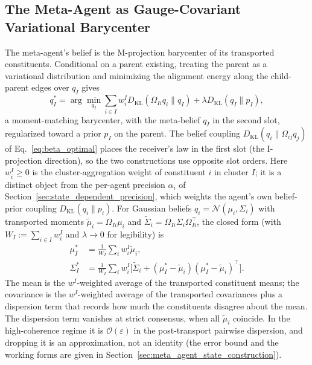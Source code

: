 \documentclass[11pt]{article}
\begin{document}
\subsection{The Meta-Agent as Gauge-Covariant Variational Barycenter}
\label{sec:meta_agent_definition}

The meta-agent's belief is the M-projection barycenter of its transported constituents. Conditional on a parent existing, treating the parent as a variational distribution and minimizing the alignment energy along the child-parent edges over $q_I$ gives
\begin{equation}
q_I^* = \arg\min_{q_I} \sum_{i \in I} w_i^I D_{\mathrm{KL}}(\Omega_{Ii} q_i \| q_I) + \lambda D_{\mathrm{KL}}(q_I \| p_I),
\label{eq:meta_agent_barycenter}
\end{equation}
a moment-matching barycenter, with the meta-belief $q_I$ in the second slot, regularized toward a prior $p_I$ on the parent. The belief coupling $D_{\mathrm{KL}}(q_i \| \Omega_{ij} q_j)$ of Eq.~\eqref{eq:beta_optimal} places the receiver's law in the first slot (the I-projection direction), so the two constructions use opposite slot orders. Here $w_i^I \ge 0$ is the cluster-aggregation weight of constituent $i$ in cluster $I$; it is a distinct object from the per-agent precision $\alpha_i$ of Section~\ref{sec:state_dependent_precision}, which weights the agent's own belief-prior coupling $D_{\mathrm{KL}}(q_i \| p_i)$. For Gaussian beliefs $q_i = \mathcal{N}(\mu_i, \Sigma_i)$ with transported moments $\tilde{\mu}_i = \Omega_{Ii}\mu_i$ and $\tilde{\Sigma}_i = \Omega_{Ii}\Sigma_i\Omega_{Ii}^\top$, the closed form (with $W_I := \sum_{i \in I} w_i^I$ and $\lambda \to 0$ for legibility) is
\begin{align}
\mu_I^* &= \tfrac{1}{W_I}\textstyle\sum_i w_i^I \tilde{\mu}_i,
\label{eq:meta_agent_mu_barycenter}
\\
\Sigma_I^* &= \tfrac{1}{W_I}\textstyle\sum_i w_i^I\big[\tilde{\Sigma}_i + (\mu_I^* - \tilde{\mu}_i)(\mu_I^* - \tilde{\mu}_i)^\top\big].
\label{eq:meta_agent_sigma_barycenter}
\end{align}
The mean is the $w^I$-weighted average of the transported constituent means; the covariance is the $w^I$-weighted average of the transported covariances plus a dispersion term that records how much the constituents disagree about the mean. The dispersion term vanishes at strict consensus, when all $\tilde{\mu}_i$ coincide. In the high-coherence regime it is $\mathcal{O}(\varepsilon)$ in the post-transport pairwise dispersion, and dropping it is an approximation, not an identity (the error bound and the working forms are given in Section~\ref{sec:meta_agent_state_construction}).
\end{document}
